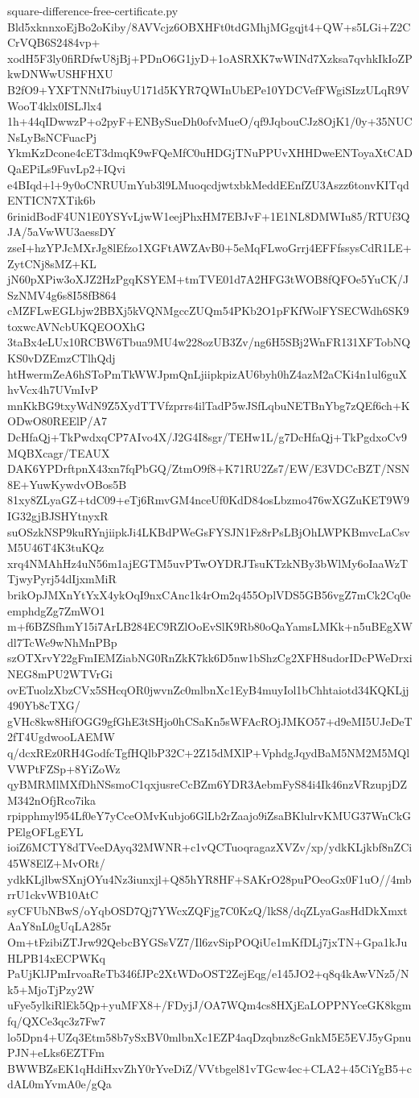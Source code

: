 \documentclass[11pt]{article}
\theoremstyle{definition}
\theoremstyle{remark}
\begin{document}
\begin{filecontents*}[overwrite]{square-difference-free-certificate.py}
Bld5xknnxoEjBo2oKiby/8AVVcjz6OBXHFt0tdGMhjMGgqjt4+QW+s5LGi+Z2CCrVQB6S2484vp+
xodH5F3ly0fiRDfwU8jBj+PDnO6G1jyD+1oASRXK7wWINd7Xzksa7qvhkIkIoZPkwDNWwUSHFHXU
B2fO9+YXFTNNtI7biuyU171d5KYR7QWInUbEPe10YDCVefFWgiSIzzULqR9VWooT4klx0ISLJlx4
1h+44qIDwwzP+o2pyF+ENBySueDh0ofvMueO/qf9JqbouCJz8OjK1/0y+35NUCNsLyBsNCFuacPj
YkmKzDcone4cET3dmqK9wFQeMfC0uHDGjTNuPPUvXHHDweENToyaXtCADQaEPiLs9FuvLp2+IQvi
e4BIqd+l+9y0oCNRUUmYub3l9LMuoqcdjwtxbkMeddEEnfZU3Aszz6tonvKITqdENTICN7XTik6b
6rinidBodF4UN1E0YSYvLjwW1eejPhxHM7EBJvF+1E1NL8DMWIu85/RTUf3QJA/5aVwWU3aessDY
zseI+hzYPJcMXrJg8lEfzo1XGFtAWZAvB0+5eMqFLwoGrrj4EFFfssysCdR1LE+ZytCNj8sMZ+KL
jN60pXPiw3oXJZ2HzPgqKSYEM+tmTVE01d7A2HFG3tWOB8fQFOe5YuCK/JSzNMV4g6s8I58fB864
cMZFLwEGLbjw2BBXj5kVQNMgccZUQm54PKb2O1pFKfWolFYSECWdh6SK9toxwcAVNcbUKQEOOXhG
3taBx4eLUx10RCBW6Tbua9MU4w228ozUB3Zv/ng6H5SBj2WnFR131XFTobNQKS0vDZEmzCTlhQdj
htHwermZeA6hSToPmTkWWJpmQnLjiipkpizAU6byh0hZ4azM2aCKi4n1ul6guXhvVcx4h7UVmIvP
mnKkBG9txyWdN9Z5XydTTVfzprrs4ilTadP5wJSfLqbuNETBnYbg7zQEf6ch+KODwO80REElP/A7
DcHfaQj+TkPwdxqCP7AIvo4X/J2G4I8sgr/TEHw1L/g7DcHfaQj+TkPgdxoCv9MQBXcagr/TEAUX
DAK6YPDrftpnX43xn7fqPbGQ/ZtmO9f8+K71RU2Zs7/EW/E3VDCcBZT/NSN8E+YuwKywdvOBos5B
81xy8ZLyaGZ+tdC09+eTj6RmvGM4nceUf0KdD84osLbzmo476wXGZuKET9W9IG32gjBJSHYtnyxR
suOSzkNSP9kuRYnjiipkJi4LKBdPWeGsFYSJN1Fz8rPsLBjOhLWPKBmvcLaCsvM5U46T4K3tuKQz
xrq4NMAhHz4uN56m1ajEGTM5uvPTwOYDRJTsuKTzkNBy3bWlMy6oIaaWzTTjwyPyrj54dIjxmMiR
brikOpJMXnYtYxX4ykOqI9nxCAnc1k4rOm2q455OplVDS5GB56vgZ7mCk2Cq0eemphdgZg7ZmWO1
m+f6BZSfhmY15i7ArLB284EC9RZlOoEvSlK9Rb80oQaYamsLMKk+n5uBEgXWdl7TcWe9wNhMnPBp
szOTXrvY22gFmIEMZiabNG0RnZkK7kk6D5nw1bShzCg2XFH8udorIDcPWeDrxiNEG8mPU2WTVrGi
ovETuolzXbzCVx5SHcqOR0jwvnZc0mlbnXc1EyB4muyIol1bChhtaiotd34KQKLjj490Yb8cTXG/
gVHc8kw8HifOGG9gfGhE3tSHjo0hCSaKn5sWFAcROjJMKO57+d9eMI5UJeDeT2fT4UgdwooLAEMW
q/dcxREz0RH4GodfcTgfHQlbP32C+2Z15dMXlP+VphdgJqydBaM5NM2M5MQlVWPtFZSp+8YiZoWz
qyBMRMlMXfDhNSsmoC1qxjusreCcBZm6YDR3AebmFyS84i4Ik46nzVRzupjDZM342nOfjRco7ika
rpipphmyl954Lf0eY7yCceOMvKubjo6GlLb2rZaajo9iZsaBKlulrvKMUG37WnCkGPElgOFLgEYL
ioiZ6MCTY8dTVeeDAyq32MWNR+c1vQCTuoqragazXVZv/xp/ydkKLjkbf8nZCi45W8ElZ+MvORt/
ydkKLjlbwSXnjOYu4Nz3iunxjl+Q85hYR8HF+SAKrO28puPOeoGx0F1uO//4mbrrU1ckvWB10AtC
syCFUbNBwS/oYqbOSD7Qj7YWcxZQFjg7C0KzQ/lkS8/dqZLyaGasHdDkXmxtAaY8nL0gUqLA285r
Om+tFzibiZTJrw92QebcBYGSsVZ7/Il6zvSipPOQiUe1mKfDLj7jxTN+Gpa1kJuHLPB14xECPWKq
PaUjKlJPmIrvoaReTb346fJPc2XtWDoOST2ZejEqg/e145JO2+q8q4kAwVNz5/Nk5+MjoTjPzy2W
uFye5ylkiRlEk5Qp+yuMFX8+/FDyjJ/OA7WQm4cs8HXjEaLOPPNYceGK8kgmfq/QXCe3qc3z7Fw7
lo5Dpn4+UZq3Etm58b7ySxBV0mlbnXc1EZP4aqDzqbnz8cGnkM5E5EVJ5yGpnuPJN+eLks6EZTFm
BWWBZsEK1qHdiHxvZhY0rYveDiZ/VVtbgel81vTGcw4ec+CLA2+45CiYgB5+cdAL0mYvmA0e/gQa

\end{filecontents*}
\end{document}
